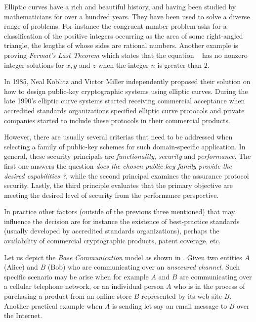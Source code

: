 
Elliptic curves have a rich and beautiful history, and having been studied by mathematicians for over a hundred years. They have been used to solve a diverse range of problems. For instance the congruent number problem asks for a classification of the positive integers occurring as the area of some right-angled triangle, the lengths of whose sides
are rational numbers. Another example is proving \textit{Fermat’s Last Theorem } which states
that the equation \EquationFermatLastTheorem ~ has no nonzero integer solutions for $x,y$ and $z$ when the integer $n$ is greater than $2$. 

In 1985, Neal Koblitz and Victor Miller independently proposed their solution on how to design public-key cryptographic systems using elliptic curves. During the late 1990’s elliptic curve systems started receiving commercial acceptance
when accredited standards organizations specified elliptic curve protocols and private companies started to include these protocols in their commercial products. 

However, there are usually several criterias that need to be addressed when selecting a family of public-key
schemes for such domain-specific application. In general, these security principals are \textit{functionality}, \textit{security} and \textit{performance}. The first one answers the question \textit{does the chosen public-key family provide the desired capabilities ?}, while the second principal examines the assurance protocol security. Lastly, the third principle evaluates that the primary objective are meeting the desired level of security from the performance perspective. 

In practice other factors (outside of the previous three mentioned) that may influence the decision are for instance the existence of best-practice standards (usually developed by accredited standards organizations), perhaps the availability of commercial cryptographic products, patent coverage, etc.  

Let us depict the \textit{Base Communication} model as shown in  . Given two entities $A$ (Alice) and $B$ (Bob) who are communicating over an \textit{unsecured channel}.  Such specific scenario may be arise when for example $A$ and $B$ are communicating over a cellular telephone network, or an individual person $A$ who is in the process of purchasing a product from an online store $B$ represented by its web site $B$.  Another practical example when $A$ is sending let say an email message to $B$ over the Internet.

